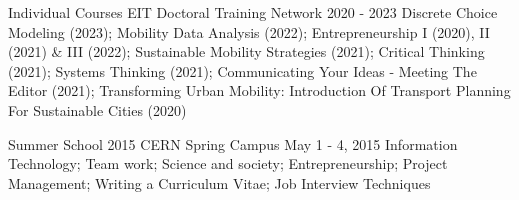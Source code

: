 

\begin{cventries}
  \cventryshort
    {Individual Courses} %
    {EIT Doctoral Training Network} %
    {2020 - 2023} %
    {} %
    {
    Discrete Choice Modeling (2023);
    Mobility Data Analysis (2022);
    Entrepreneurship I (2020), II (2021) \& III (2022);
    Sustainable Mobility Strategies (2021);
    Critical Thinking (2021); 
    Systems Thinking (2021); 
    Communicating Your Ideas - Meeting The Editor (2021);
    Transforming Urban Mobility: Introduction Of Transport Planning For Sustainable Cities (2020) 
    }
    
  \cventryshort
    {Summer School} %
    {2015 CERN Spring Campus} %
    {May 1 - 4, 2015} %
    {} %
    {
    Information Technology; 
    Team work;
    Science and society;
    Entrepreneurship;
    Project Management;
    Writing a Curriculum Vitae;
    Job Interview Techniques
    }

\end{cventries}

